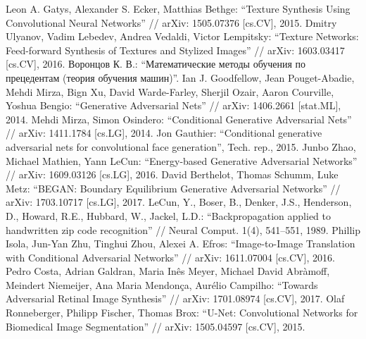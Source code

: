 \documentclass[a4paper]{article}
\begin{document}
	
	\setcounter{page}{2}
	\tableofcontents
	
	
	
	
	
	
	
	\begin{thebibliography}{99}
		 Leon A. Gatys, Alexander S. Ecker, Matthias Bethge: ``Texture Synthesis Using Convolutional Neural Networks'' // arXiv: 1505.07376 [cs.CV], 2015.
		 Dmitry Ulyanov, Vadim Lebedev, Andrea Vedaldi, Victor Lempitsky: ``Texture Networks: Feed-forward Synthesis of Textures and Stylized Images'' // arXiv: 1603.03417 [cs.CV], 2016.
		  Воронцов К. В.: ``Математические методы обучения по прецедентам (теория обучения машин)''.
		 Ian J. Goodfellow, Jean Pouget-Abadie, Mehdi Mirza, Bign Xu, David Warde-Farley, Sherjil Ozair, Aaron Courville, Yoshua Bengio: ``Generative Adversarial Nets'' // arXiv: 1406.2661 [stat.ML], 2014.
		 Mehdi Mirza, Simon Osindero: ``Conditional Generative Adversarial Nets'' // arXiv: 1411.1784 [cs.LG], 2014.
		 Jon Gauthier: ``Conditional generative adversarial nets for convolutional face generation'', Tech. rep., 2015.
		 Junbo Zhao, Michael Mathien, Yann LeCun: ``Energy-based Generative Adversarial Networks'' // arXiv: 1609.03126 [cs.LG], 2016.
		 David Berthelot, Thomas Schumm, Luke Metz: ``BEGAN: Boundary Equilibrium Generative Adversarial Networks'' // arXiv: 1703.10717 [cs.LG], 2017.
		 LeCun, Y., Boser, B., Denker, J.S., Henderson, D., Howard, R.E., Hubbard, W., Jackel, L.D.: ``Backpropagation applied to handwritten zip code recognition'' // Neural Comput. 1(4), 541–551, 1989.
		 Phillip Isola, Jun-Yan Zhu, Tinghui Zhou, Alexei A. Efros: ``Image-to-Image Translation with Conditional Adversarial Networks'' // arXiv: 1611.07004 [cs.CV], 2016.
		 Pedro Costa, Adrian Galdran, Maria Inês Meyer, Michael David Abràmoff, Meindert Niemeijer, Ana Maria Mendonça, Aurélio Campilho: ``Towards Adversarial Retinal Image Synthesis'' // arXiv: 1701.08974 [cs.CV], 2017.
		 Olaf Ronneberger, Philipp Fischer, Thomas Brox: ``U-Net: Convolutional Networks for Biomedical Image Segmentation'' // arXiv: 1505.04597 [cs.CV], 2015.

\end{thebibliography}
\end{document}
